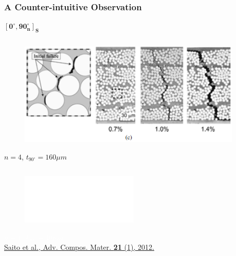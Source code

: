 \documentclass[first,firstsupp,lastsupp,last,hyperref,table]{ETHclass}
\begin{document}
\begin{frame}
\frametitle{\vspace{0.3cm}\small A Counter-intuitive Observation}
\vspace{-0.5cm}
\centering
\tiny
$\mathbf{\left[0^{\circ}, 90^{\circ}_{n}\right]_{S}}$
\vspace{-0.25cm}
\begin{columns}[c]
\begin{column}{0.5\textwidth}
\centering
\begin{figure}
\centering
\includegraphics[width=\columnwidth]{saito-thick.png}
\end{figure}
\vspace{-0.4cm}
$n=4$, $t_{90^{\circ}}=160\mu m$
\end{column}
\begin{column}{0.5\textwidth}
\centering

\end{column}
\end{columns}
\vspace{-0.1cm}
\centering
\begin{figure}
\centering
\includegraphics[width=0.5\textwidth]{saito-fill.png}
\end{figure}
\vspace{-0.25cm}
\textcolor{white}{$n=1$, $t_{90^{\circ}}=40\mu m$}\\\vspace{5pt}
\pgfmathsetmacro{}
\pgfmathsetmacro{}
{\fontsize{\fontsizeref}{\stretchref} \selectfont \href{https://doi.org/10.1163/156855112X629522}{Saito et al., Adv. Compos. Mater. \textbf{21} (1), 2012.}}
\end{frame}
\end{document}
